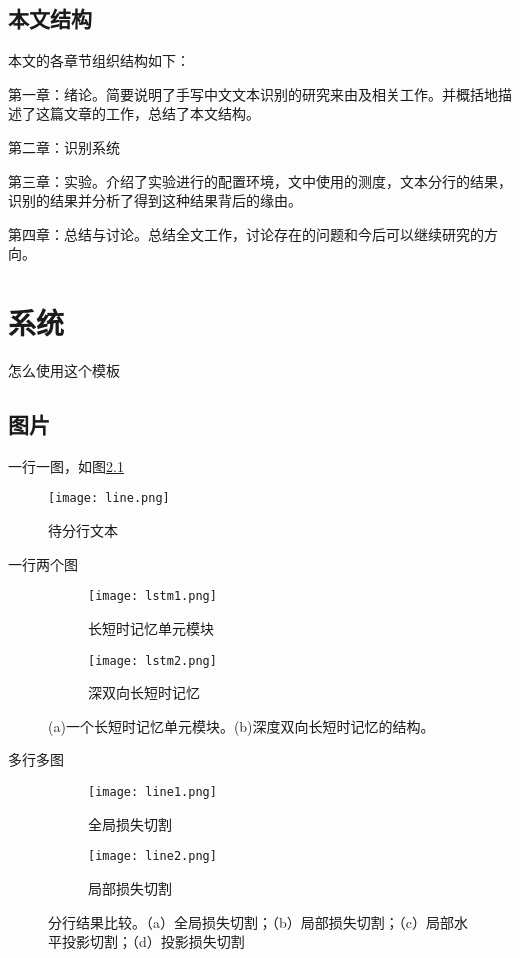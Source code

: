 \documentclass[winfonts]{njuthesis}
\begin{document}
\section{本文结构}
本文的各章节组织结构如下：

第一章：绪论。简要说明了手写中文文本识别的研究来由及相关工作。并概括地描述了这篇文章的工作，总结了本文结构。

第二章：识别系统

第三章：实验。介绍了实验进行的配置环境，文中使用的测度，文本分行的结果，识别的结果并分析了得到这种结果背后的缘由。

第四章：总结与讨论。总结全文工作，讨论存在的问题和今后可以继续研究的方向。

\chapter{系统}\label{chapter_system}

怎么使用这个模板

\section{图片}

一行一图，如图\ref{fig:line}
\begin{figure}[htbp]
   \centering
   \texttt{[image: line.png]} %
   \caption{待分行文本}
   \label{fig:line}
\end{figure}


一行两个图
\begin{figure}[ht!]
    \centering
    \begin{subfigure}{.5\textwidth}
    	\centering
        \texttt{[image: lstm1.png]}
        \caption{长短时记忆单元模块}
    \end{subfigure}
    \begin{subfigure}{.4\textwidth}
    	\centering
        \texttt{[image: lstm2.png]}
        \caption{深双向长短时记忆}
        \label{fig:lstm2}
    \end{subfigure}
    \caption{(a)一个长短时记忆单元模块。(b)深度双向长短时记忆的结构。}
\label{fig:lstm}
\end{figure}

多行多图
\begin{figure}[ht!]
    \centering
    \begin{subfigure}{\textwidth}
        \centering
        \texttt{[image: line1.png]}
        \caption{全局损失切割}
        \label{fig:line1}
    \end{subfigure}
    \begin{subfigure}{\textwidth}
    	\centering
        \texttt{[image: line2.png]}
        \caption{局部损失切割}
        \label{fig:line2}
    \end{subfigure}
    \caption{分行结果比较。（a）全局损失切割；（b）局部损失切割；（c）局部水平投影切割；（d）投影损失切割}
\end{figure}
\end{document}
